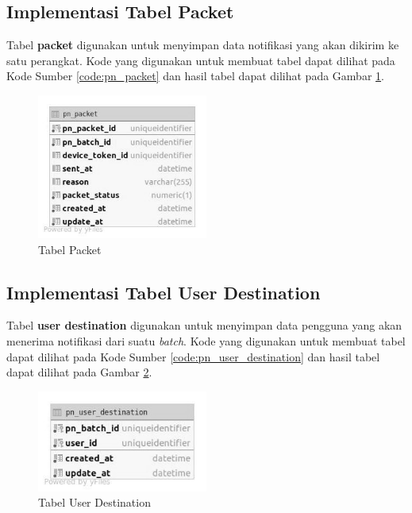 \subsection{Implementasi Tabel Packet}
\par Tabel \textbf{packet} digunakan untuk menyimpan data notifikasi yang akan dikirim ke satu perangkat. Kode yang digunakan untuk membuat tabel dapat dilihat pada Kode Sumber \ref{code:pn_packet} dan hasil tabel dapat dilihat pada Gambar \ref{tabel_pn_packet}.

\begin{figure}[H]
    \centering\includegraphics[width=0.5\textwidth]{bab4/figures/tabel_pn_packet.jpg}
    \caption{Tabel Packet}
    \label{tabel_pn_packet}
\end{figure}

\subsection{Implementasi Tabel User Destination}
\par Tabel \textbf{user destination} digunakan untuk menyimpan data pengguna yang akan menerima notifikasi dari suatu \textit{batch}. Kode yang digunakan untuk membuat tabel dapat dilihat pada Kode Sumber \ref{code:pn_user_destination} dan hasil tabel dapat dilihat pada Gambar \ref{tabel_pn_user_destination}.

\begin{figure}[H]
    \centering\includegraphics[width=0.5\textwidth]{bab4/figures/tabel_pn_user_destination.jpg}
    \caption{Tabel User Destination}
    \label{tabel_pn_user_destination}
\end{figure}

